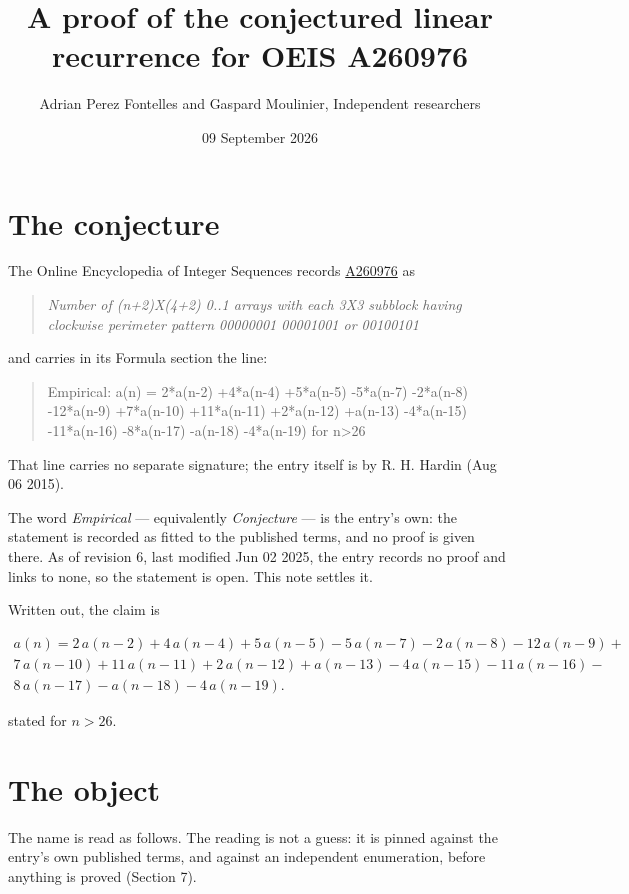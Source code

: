 \documentclass[11pt]{article}
\title{A proof of the conjectured linear recurrence for OEIS A260976}
\author{Adrian Perez Fontelles and Gaspard Moulinier, Independent researchers}
\date{09 September 2026}
\theoremstyle{definition}
\begin{document}
\maketitle
\section{The conjecture}

The Online Encyclopedia of Integer Sequences records \href{https://oeis.org/A260976}{A260976} as

\begin{quote}\itshape Number of (n+2)X(4+2) 0..1 arrays with each 3X3 subblock having clockwise perimeter pattern 00000001 00001001 or 00100101\end{quote}

and carries in its Formula section the line:

\begin{quote}\ttfamily Empirical: a(n) = 2*a(n-2) +4*a(n-4) +5*a(n-5) -5*a(n-7) -2*a(n-8) -12*a(n-9) +7*a(n-10) +11*a(n-11) +2*a(n-12) +a(n-13) -4*a(n-15) -11*a(n-16) -8*a(n-17) -a(n-18) -4*a(n-19) for n>26\end{quote}

That line carries no separate signature; the entry itself is by R. H. Hardin (Aug 06 2015).

The word {\itshape Empirical} --- equivalently {\itshape Conjecture} --- is the entry's own: the statement is recorded as fitted to the published terms, and no proof is given there. As of revision 6, last modified Jun 02 2025, the entry records no proof and links to none, so the statement is open. This note settles it.

Written out, the claim is

\begin{multline*} a(n) = 2\,a(n-2) + 4\,a(n-4) + 5\,a(n-5) - 5\,a(n-7) - 2\,a(n-8) - 12\,a(n-9) + \\ 7\,a(n-10) + 11\,a(n-11) + 2\,a(n-12) + a(n-13) - 4\,a(n-15) - 11\,a(n-16) - \\ 8\,a(n-17) - a(n-18) - 4\,a(n-19). \end{multline*}

stated for $n > 26$.

\section{The object}

The name is read as follows. The reading is not a guess: it is pinned against the entry's own published terms, and against an independent enumeration, before anything is proved (Section 7).
\end{document}
